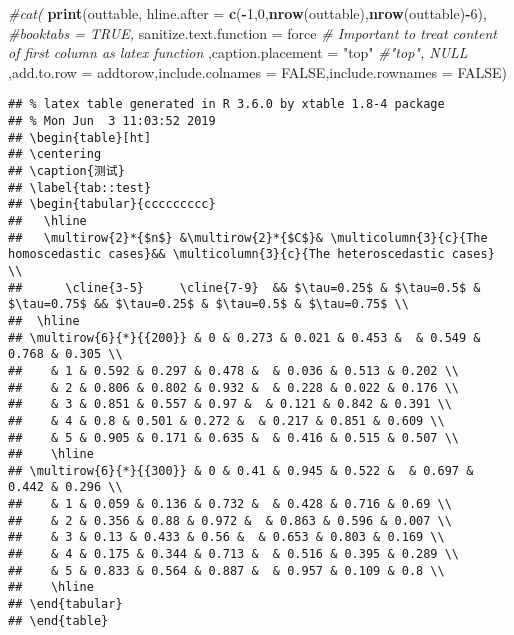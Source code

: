 \documentclass[]{ctexbook}
\newenvironment{Shaded}{\begin{snugshade}}{\end{snugshade}}
\newcommand{\CommentTok}[1]{\textcolor[rgb]{0.56,0.35,0.01}{\textit{#1}}}
\newcommand{\DataTypeTok}[1]{\textcolor[rgb]{0.13,0.29,0.53}{#1}}
\newcommand{\DecValTok}[1]{\textcolor[rgb]{0.00,0.00,0.81}{#1}}
\newcommand{\KeywordTok}[1]{\textcolor[rgb]{0.13,0.29,0.53}{\textbf{#1}}}
\newcommand{\NormalTok}[1]{#1}
\newcommand{\OperatorTok}[1]{\textcolor[rgb]{0.81,0.36,0.00}{\textbf{#1}}}
\newcommand{\OtherTok}[1]{\textcolor[rgb]{0.56,0.35,0.01}{#1}}
\newcommand{\StringTok}[1]{\textcolor[rgb]{0.31,0.60,0.02}{#1}}
\begin{document}
\begin{Shaded}
\begin{Highlighting}[]
\CommentTok{#cat(}
  \KeywordTok{print}\NormalTok{(outtable,}
          \DataTypeTok{hline.after =} \KeywordTok{c}\NormalTok{(}\OperatorTok{-}\DecValTok{1}\NormalTok{,}\DecValTok{0}\NormalTok{,}\KeywordTok{nrow}\NormalTok{(outtable),}\KeywordTok{nrow}\NormalTok{(outtable)}\OperatorTok{-}\DecValTok{6}\NormalTok{),}
          \CommentTok{#booktabs = TRUE,}
          \DataTypeTok{sanitize.text.function =}\NormalTok{ force }\CommentTok{# Important to treat content of first column as latex function}
\NormalTok{          ,}\DataTypeTok{caption.placement =} \StringTok{"top"} \CommentTok{#"top", NULL}
\NormalTok{          ,}\DataTypeTok{add.to.row =}\NormalTok{ addtorow,}\DataTypeTok{include.colnames =} \OtherTok{FALSE}\NormalTok{,}\DataTypeTok{include.rownames =} \OtherTok{FALSE}\NormalTok{)}
\end{Highlighting}
\end{Shaded}

\begin{verbatim}
## % latex table generated in R 3.6.0 by xtable 1.8-4 package
## % Mon Jun  3 11:03:52 2019
## \begin{table}[ht]
## \centering
## \caption{测试} 
## \label{tab::test}
## \begin{tabular}{ccccccccc}
##   \hline
##   \multirow{2}*{$n$} &\multirow{2}*{$C$}& \multicolumn{3}{c}{The homoscedastic cases}&& \multicolumn{3}{c}{The heteroscedastic cases} \\
##      \cline{3-5}     \cline{7-9}  && $\tau=0.25$ & $\tau=0.5$ & $\tau=0.75$ && $\tau=0.25$ & $\tau=0.5$ & $\tau=0.75$ \\
##  \hline
## \multirow{6}{*}{{200}} & 0 & 0.273 & 0.021 & 0.453 &  & 0.549 & 0.768 & 0.305 \\ 
##    & 1 & 0.592 & 0.297 & 0.478 &  & 0.036 & 0.513 & 0.202 \\ 
##    & 2 & 0.806 & 0.802 & 0.932 &  & 0.228 & 0.022 & 0.176 \\ 
##    & 3 & 0.851 & 0.557 & 0.97 &  & 0.121 & 0.842 & 0.391 \\ 
##    & 4 & 0.8 & 0.501 & 0.272 &  & 0.217 & 0.851 & 0.609 \\ 
##    & 5 & 0.905 & 0.171 & 0.635 &  & 0.416 & 0.515 & 0.507 \\ 
##    \hline
## \multirow{6}{*}{{300}} & 0 & 0.41 & 0.945 & 0.522 &  & 0.697 & 0.442 & 0.296 \\ 
##    & 1 & 0.059 & 0.136 & 0.732 &  & 0.428 & 0.716 & 0.69 \\ 
##    & 2 & 0.356 & 0.88 & 0.972 &  & 0.863 & 0.596 & 0.007 \\ 
##    & 3 & 0.13 & 0.433 & 0.56 &  & 0.653 & 0.803 & 0.169 \\ 
##    & 4 & 0.175 & 0.344 & 0.713 &  & 0.516 & 0.395 & 0.289 \\ 
##    & 5 & 0.833 & 0.564 & 0.887 &  & 0.957 & 0.109 & 0.8 \\ 
##    \hline
## \end{tabular}
## \end{table}
\end{verbatim}
\end{document}
